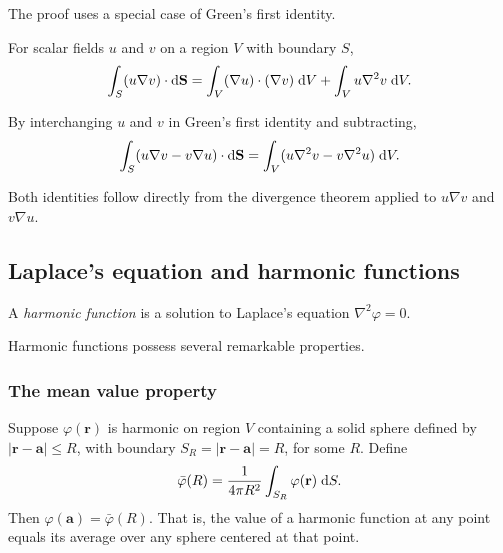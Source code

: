 \documentclass[a4paper]{article}
\begin{document}
The proof uses a special case of Green's first identity.

\begin{prop}
  For scalar fields $u$ and $v$ on a region $V$ with boundary $S$,
  \[
    \int_S (u\nabla v)\cdot \mathrm{d} \mathbf{S} = \int_V (\nabla u)\cdot (\nabla v)\;\mathrm{d} V + \int_V u\nabla^2 v\;\mathrm{d} V.
  \]
\end{prop}

\begin{prop}
  By interchanging $u$ and $v$ in Green's first identity and subtracting,
  \[
    \int_S (u\nabla v - v\nabla u)\cdot\mathrm{d} \mathbf{S} = \int_V (u\nabla^2 v - v\nabla^2 u)\;\mathrm{d} V.
  \]
\end{prop}

\begin{rmk}
  Both identities follow directly from the divergence theorem applied to $u\nabla v$ and $v\nabla u$.
\end{rmk}
\subsection{Laplace's equation and harmonic functions}
\begin{defi}
  A \emph{harmonic function} is a solution to Laplace's equation $\nabla^2\varphi = 0$.
\end{defi}

Harmonic functions possess several remarkable properties.
\subsubsection{The mean value property}
\begin{prop}
  Suppose $\varphi(\mathbf{r})$ is harmonic on region $V$ containing a solid sphere defined by $|\mathbf{r} - \mathbf{a}| \leq R$, with boundary $S_R = |\mathbf{r} - \mathbf{a}| = R$, for some $R$. Define
  \[
    \bar\varphi (R) = \frac{1}{4\pi R^2}\int_{S_R}\varphi(\mathbf{r})\;\mathrm{d} S.
  \]
  Then $\varphi(\mathbf{a}) = \bar\varphi (R)$. That is, the value of a harmonic function at any point equals its average over any sphere centered at that point.
\end{prop}
\end{document}
